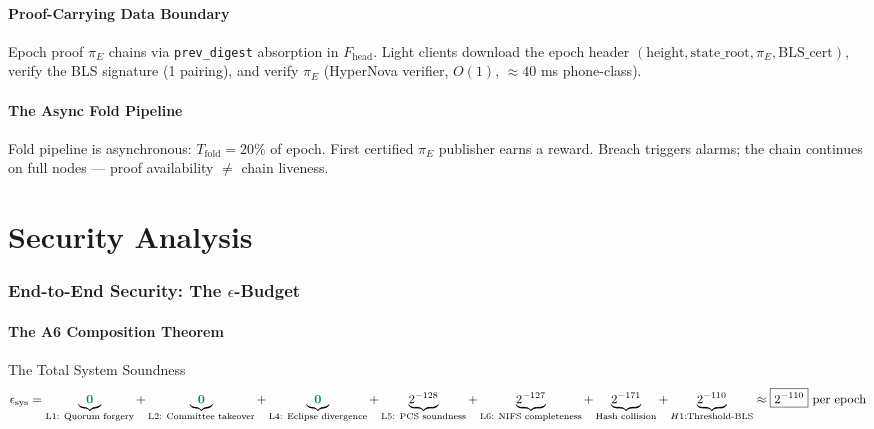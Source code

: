 \documentclass[11pt, a4paper]{article}
\theoremstyle{plain}
\theoremstyle{definition}
\theoremstyle{remark}
\begin{document}
\subsection{Proof-Carrying Data Boundary}

Epoch proof $\pi_E$ chains via \texttt{prev\_digest} absorption in
 $F_{\text{head}}$. Light clients download the epoch header
 $(\text{height}, \text{state\_root}, \pi_E, \text{BLS\_cert})$, verify
the BLS signature (1 pairing), and verify $\pi_E$ (HyperNova verifier,
 $O(1)$, $\approx 40$ ms phone-class).

\subsection{The Async Fold Pipeline}

Fold pipeline is asynchronous: $T_{\text{fold}} = 20\%$ of epoch.
First certified $\pi_E$ publisher earns a reward. Breach triggers
alarms; the chain continues on full nodes --- proof availability
 $\neq$ chain liveness.

\part{Security Analysis}

\section{End-to-End Security: The $\epsilon$-Budget}
\label{sec:security}

\subsection{The A6 Composition Theorem}

\begin{keybox}{The Total System Soundness}
\begin{equation}
\epsilon_{\text{sys}} =
\underbrace{\textcolor{hsmaGreen}{\mathbf{0}}}_{\text{L1: Quorum forgery}} +
\underbrace{\textcolor{hsmaGreen}{\mathbf{0}}}_{\text{L2: Committee takeover}} +
\underbrace{\textcolor{hsmaGreen}{\mathbf{0}}}_{\text{L4: Eclipse divergence}} +
\underbrace{2^{-128}}_{\text{L5: PCS soundness}} +
\underbrace{2^{-127}}_{\text{L6: NIFS completeness}} +
\underbrace{2^{-171}}_{\text{Hash collision}} +
\underbrace{2^{-110}}_{H1: \text{Threshold-BLS}}
\approx \boxed{2^{-110}} \text{ per epoch}
\end{equation}
\end{keybox}
\end{document}
